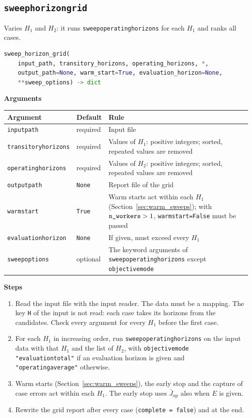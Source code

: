 \documentclass[11pt,a4paper]{article}
\makeatletter
\theoremstyle{plain}
\theoremstyle{definition}
\newcommand{\blockhead}[1]{\par\noindent\textbf{#1}\par\nobreak}
\renewcommand{\_}{\textunderscore\allowbreak{}}
\providecommand{\typerow}[3]{{\raggedright #1\par} & {\raggedright #2\par} & {\raggedright #3\par} \\}
\providecommand{\tabstart}[2]{\begingroup\small\begin{longtable}{@{}#1@{}}\toprule #2 \\ \midrule \endhead}
\providecommand{\tabend}{\bottomrule\end{longtable}\endgroup}
\makeatother
\begin{document}
\subsection{\texttt{sweep\_horizon\_grid}}
\label{sec:sweep_grid}

Varies $H_1$ and $H_2$: it runs \texttt{sweep\_operating\_horizons} for each $H_1$ and ranks all cases.

\begin{lstlisting}[language=Python]
sweep_horizon_grid(
    input_path, transitory_horizons, operating_horizons, *,
    output_path=None, warm_start=True, evaluation_horizon=None,
    **sweep_options) -> dict
\end{lstlisting}

\blockhead{Arguments}
\tabstart{p{4.3cm}p{2.3cm}p{8.2cm}}{Argument & Default & Rule}
\typerow{\texttt{input\_path}}{required}{Input file}
\typerow{\texttt{transitory\_horizons}}{required}{Values of $H_1$: positive integers; sorted, repeated values are removed}
\typerow{\texttt{operating\_horizons}}{required}{Values of $H_2$: positive integers; sorted, repeated values are removed}
\typerow{\texttt{output\_path}}{\texttt{None}}{Report file of the grid}
\typerow{\texttt{warm\_start}}{\texttt{True}}{Warm starts act within each $H_1$ (Section~\ref{sec:warm_sweeps}); with $\texttt{n\_workers} > 1$, \texttt{warm\_start=False} must be passed}
\typerow{\texttt{evaluation\_horizon}}{\texttt{None}}{If given, must exceed every $H_1$}
\typerow{\texttt{sweep\_options}}{optional}{The keyword arguments of \texttt{sweep\_operating\_horizons} except \texttt{objective\_mode}}
\tabend

\blockhead{Steps}
\begin{enumerate}[nosep,label=\arabic*.]
  \item Read the input file with the input reader. The data must be a mapping. The key \texttt{H} of the input is not read: each case takes its horizons from the candidates. Check every argument for every $H_1$ before the first case.
  \item For each $H_1$ in increasing order, run \texttt{sweep\_operating\_horizons} on the input data with that $H_1$ and the list of $H_2$, with \texttt{objective\_mode} \texttt{"evaluation\_total"} if an evaluation horizon is given and \texttt{"operating\_average"} otherwise.
  \item Warm starts (Section~\ref{sec:warm_sweeps}), the early stop and the capture of case errors act within each $H_1$. The early stop uses $\bar J_{\mathrm{op}}$ also when $E$ is given.
  \item Rewrite the grid report after every case (\texttt{complete = false}) and at the end.
\end{enumerate}
\end{document}
